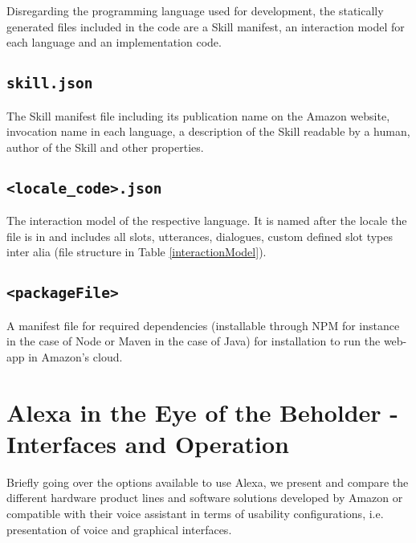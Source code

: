 Disregarding the programming language used for development, the statically generated files included in the code are a Skill manifest, an interaction model for each language and an implementation code.


\subsection*{\texttt{skill.json}}
The Skill manifest file including its publication name on the Amazon website, invocation name in each language, a description of the Skill readable by a human, author of the Skill and other properties.

\subsection*{\texttt{<locale_code>.json}}
The interaction model of the respective language. It is named after the locale the file is in and includes all slots, utterances, dialogues, custom defined slot types inter alia (file structure in Table \ref{interactionModel}).

\subsection*{\texttt{<packageFile>}}
A manifest file for required dependencies (installable through NPM for instance in the case of Node or Maven in the case of Java) for installation to run the web-app in Amazon's cloud.




\section[Alexa in the Eye of the Beholder]{Alexa in the Eye of the Beholder - \\Interfaces and Operation}
\label{testdevices}

Briefly going over the options available to use Alexa, we present and compare the different hardware product lines and software solutions developed by Amazon or compatible with their voice assistant in terms of usability configurations, i.e. presentation of voice and graphical interfaces.

